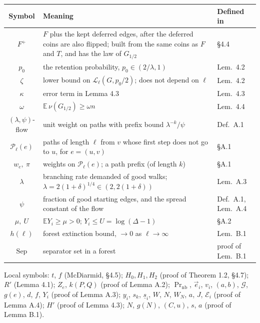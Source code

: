 ﻿\documentclass[10pt,a4paper]{article}
\newcommand{\E}{\mathbb{E}}
\DeclareMathOperator{\Prob}{Pr}
\newcommand{\Lp}{\mathcal{L}}
\begin{document}
\begin{longtable}{SMW}
\toprule
Symbol & Meaning & Defined in \\
\midrule
\endhead
\(F^+\) & \(F\) plus the kept deferred edges, after the deferred coins are also flipped; built from the same coins as \(F\) and \(T\), and has the law of \(G_{1/2}\) & \S4.4 \\
\(p_0\) & the retention probability, \(p_0\in(2/\lambda,1)\) & Lem.~4.2 \\
\(\zeta\) & lower bound on \(\Lp_\ell(G,p_0/2)\); does not depend on \(\ell\) & Lem.~4.2 \\
\(\kappa\) & error term in Lemma 4.3 & Lem.~4.3 \\
\(\omega\) & \(\E\,\nu(G_{1/2})\ge\omega n\) & Lem.~4.4 \\
\((\lambda,\psi)\)-flow & unit weight on paths with prefix bound \(\lambda^{-k}/\psi\) & Def.~A.1 \\
\(\mathcal P_\ell(e)\) & paths of length \(\ell\) from \(v\) whose first step does not go to \(u\), for \(e=(u,v)\) & \S A.1 \\
\(w_e,\ \pi\) & weights on \(\mathcal P_\ell(e)\); a path prefix (of length \(k\)) & \S A.1 \\
\(\lambda\) & branching rate demanded of good walks; \(\lambda=2(1+\delta)^{1/4}\in(2,2(1+\delta))\) & Lem.~A.3 \\
\(\psi\) & fraction of good starting edges, and the spread constant of the flow & Def.~A.1, Lem.~A.4 \\
\(\mu,\ U\) & \(\E Y_i\ge\mu>0\); \(Y_i\le U=\log(\Delta-1)\) & \S A.2 \\
\(h(\ell)\) & forest extinction bound, \(\to0\) as \(\ell\to\infty\) & Lem.~B.1 \\
\(\mathrm{Sep}\) & separator set in a forest & proof of Lem.~B.1 \\
\bottomrule
\end{longtable}

Local symbols: \(t\), \(f\) (McDiarmid, \S4.5); \(H_0,H_1,H_2\) (proof of
Theorem 1.2, \S4.7); \(R'\) (Lemma 4.1); \(Z_e\), \(k(P,Q)\) (proof of
Lemma A.2); \(\Prob_{\mathrm{nb}}\), \(\vec e_i\), \(v_i\), \((a,b)\),
\(\mathcal G\), \(g(e)\), \(d\), \(f\), \(Y_i\) (proof of Lemma A.3); \(y_i\),
\(s_k\), \(\underline s_i\), \(W\), \(N\), \(W_N\), \(a\), \(J\),
\(\mathcal E_i\) (proof of Lemma A.4); \(H'\) (proof of Lemma 4.3); \(N\),
\(g(N)\), \((C,u)\), \(s\), \(a\) (proof of Lemma B.1).

\end{document}
